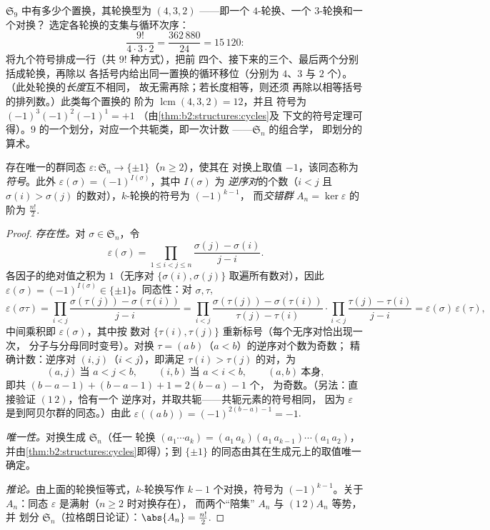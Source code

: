 \begin{example}[轮换型的计数]\label{ex:b2:structures:cycletype}
$\mathfrak{S}_9$ 中有多少个置换，其轮换型为
$(4, 3, 2)$ ——即一个 $4$-轮换、一个 $3$-轮换和一个对换？
选定各轮换的支集与循环次序：
\[
\frac{9!}{4\cdot 3\cdot 2}
= \frac{362\,880}{24} = 15\,120 :
\]
将九个符号排成一行（共 $9!$ 种方式），把前
四个、接下来的三个、最后两个分别括成轮换，再除以
各括号内给出同一置换的循环移位（分别为 $4$、$3$ 与 $2$ 个）。
（此处轮换的\emph{长度}互不相同，
故无需再除；若长度相等，则还须
再除以相等括号的排列数。）此类每个置换的
阶为 $\operatorname{lcm}(4,3,2) = 12$，并且
符号为 $(-1)^3(-1)^2(-1)^1 = +1$
（由\cref{thm:b2:structures:cycles}及
下文的符号定理可得）。$9$ 的一个划分，对应一个共轭类，即一次计数
——$\mathfrak{S}_n$ 的组合学，
即划分的算术。
\end{example}

\begin{theorem}[符号]\label{thm:b2:structures:signature}
存在唯一的群同态 $\varepsilon \colon
\mathfrak{S}_n \to \{\pm 1\}$（$n \geq 2$），使其在
对换上取值 $-1$，该同态称为\emph{符号}。此外
$\varepsilon(\sigma) = (-1)^{I(\sigma)}$，其中 $I(\sigma)$ 为
\emph{逆序对}的个数（$i < j$ 且 $\sigma(i) >
\sigma(j)$ 的数对），$k$-轮换的符号为 $(-1)^{k-1}$，
而\emph{交错群} $A_n = \ker\varepsilon$ 的阶为
$\frac{n!}{2}$.
\end{theorem}

\begin{proof}
\emph{存在性。}对 $\sigma \in \mathfrak{S}_n$，令
\[
\varepsilon(\sigma)
= \prod_{1 \leq i < j \leq n}
\frac{\sigma(j) - \sigma(i)}{j - i} .
\]
各因子的绝对值之积为 $1$（无序对
$\{\sigma(i), \sigma(j)\}$ 取遍所有数对），因此
$\varepsilon(\sigma) = (-1)^{I(\sigma)} \in \{\pm1\}$。同态性：对
$\sigma, \tau$,
\[
\varepsilon(\sigma\tau)
= \prod_{i<j} \frac{\sigma(\tau(j)) - \sigma(\tau(i))}{j - i}
= \prod_{i<j} \frac{\sigma(\tau(j)) - \sigma(\tau(i))}{\tau(j) -
\tau(i)} \cdot \prod_{i<j} \frac{\tau(j) - \tau(i)}{j - i}
= \varepsilon(\sigma)\,\varepsilon(\tau),
\]
中间乘积即 $\varepsilon(\sigma)$，其中按
数对 $\{\tau(i), \tau(j)\}$ 重新标号（每个无序对恰出现一次，
分子与分母同时变号）。对换
$\tau = (a\,b)$（$a < b$）的逆序对个数为奇数；
精确计数：逆序对 $(i, j)$（$i < j$），即满足
$\tau(i) > \tau(j)$ 的对，为
\[
(a, j) \ \text{当 } a < j < b, \qquad
(i, b) \ \text{当 } a < i < b, \qquad
(a, b) \ \text{本身},
\]
即共 $(b - a - 1) + (b - a - 1) + 1 = 2(b - a) - 1$ 个，
为奇数。（另法：直接验证 $(1\,2)$，恰有一个
逆序对，并取共轭——共轭元素的符号相同，
因为 $\varepsilon$ 是到阿贝尔群的同态。）由此
$\varepsilon((a\,b)) = (-1)^{2(b-a)-1} = -1$.

\emph{唯一性。}对换生成 $\mathfrak{S}_n$（任一
轮换 $(a_1\cdots a_k) = (a_1\,a_k)(a_1\,a_{k-1})\cdots(a_1\,a_2)$，
并由\cref{thm:b2:structures:cycles}即得）；到
$\{\pm1\}$ 的同态由其在生成元上的取值唯一确定。

\emph{推论。}由上面的轮换恒等式，$k$-轮换写作
$k - 1$ 个对换，符号为 $(-1)^{k-1}$。关于 $A_n$：同态
$\varepsilon$ 是满射（$n \geq 2$ 时对换存在），
而两个“陪集” $A_n$ 与 $(1\,2)A_n$ 等势，并
划分 $\mathfrak{S}_n$（拉格朗日论证）：$\abs{A_n} =
\frac{n!}{2}$.
\end{proof}


